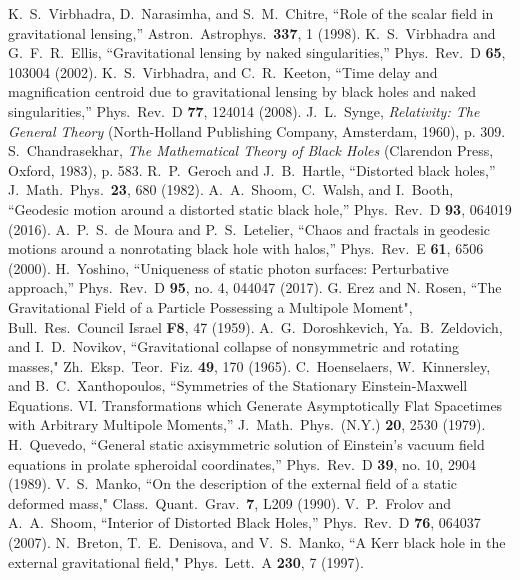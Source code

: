 \documentclass[twocolumn,showpacs,preprintnumbers,amsmath,amssymb,floatfix,nofootinbib]{revtex4-1}
\begin{document}
\begin{thebibliography}{99}
 K.~S.~Virbhadra, D.~Narasimha, and S.~M.~Chitre, ``Role of the scalar field in gravitational lensing,'' Astron.\ Astrophys.\  {\bf 337}, 1 (1998).
 K.~S.~Virbhadra and G.~F.~R.~Ellis, ``Gravitational lensing by naked singularities,'' Phys.\ Rev.\ D {\bf 65}, 103004 (2002).
 K.~S.~Virbhadra, and C.~R.~Keeton, ``Time delay and magnification centroid due to gravitational lensing by black holes and naked singularities,'' Phys.\ Rev.\ D {\bf 77}, 124014 (2008).
 J.~L.~Synge, {\em Relativity: The General Theory} (North-Holland Publishing Company, Amsterdam, 1960), p. 309.
 S.~Chandrasekhar, {\em The Mathematical Theory of Black Holes} (Clarendon Press, Oxford, 1983), p. 583.
 R.~P.~Geroch and J.~B.~Hartle, ``Distorted black holes,'' J.\ Math.\ Phys.\  {\bf 23}, 680 (1982).
 A.~A.~Shoom, C.~Walsh, and I.~Booth, ``Geodesic motion around a distorted static black hole,'' Phys.\ Rev.\ D {\bf 93}, 064019 (2016).
 A.~P.~S.~de Moura and P.~S.~Letelier, ``Chaos and fractals in geodesic motions around a nonrotating black hole with halos,'' Phys.\ Rev.\ E {\bf 61}, 6506 (2000).
 H.~Yoshino, ``Uniqueness of static photon surfaces: Perturbative approach,'' Phys.\ Rev.\ D {\bf 95}, no. 4, 044047 (2017).
 G. Erez and N. Rosen, ``The Gravitational Field of a Particle Possessing a Multipole Moment", Bull.\ Res.\ Council Israel {\bf F8}, 47 (1959).
  A.~G.~Doroshkevich, Ya.~B.~Zeldovich, and I.~D.~Novikov, ``Gravitational collapse of nonsymmetric and rotating masses," Zh.\ Eksp.\ Teor.\ Fiz. {\bf 49}, 170 (1965).
 C.~Hoenselaers, W.~Kinnersley, and B.~C.~Xanthopoulos, ``Symmetries of the Stationary Einstein-Maxwell Equations. VI. Transformations which Generate Asymptotically Flat Spacetimes with Arbitrary Multipole Moments,'' J.\ Math.\ Phys.\  (N.Y.) {\bf 20}, 2530 (1979).
 H.~Quevedo, ``General static axisymmetric solution of Einstein's vacuum field equations in prolate spheroidal coordinates,'' Phys.\ Rev.\ D {\bf 39}, no. 10, 2904 (1989).
 V.~S.~Manko, ``On the description of the external field of a static deformed mass," Class.\ Quant.\ Grav.\  {\bf 7}, L209 (1990).
 V.~P.~Frolov and A.~A.~Shoom, ``Interior of Distorted Black Holes,'' Phys.\ Rev.\ D {\bf 76}, 064037 (2007). 
 N.~Breton, T.~E.~Denisova, and V.~S.~Manko, ``A Kerr black hole in the external gravitational field," Phys.\ Lett.\ A {\bf 230}, 7 (1997).

\end{thebibliography}
\end{document}
